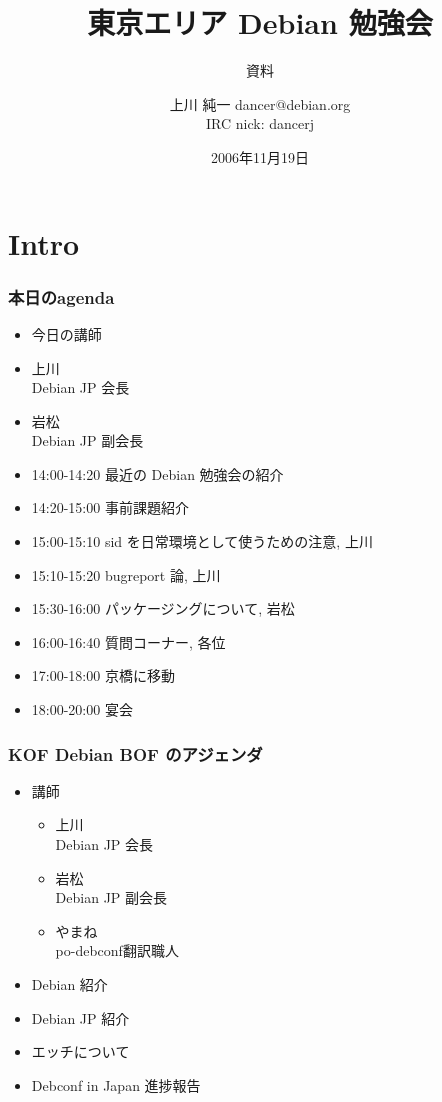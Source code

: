 \documentclass[cjk,dvipdfmx]{beamer}
\title{東京エリア Debian 勉強会}
\subtitle{資料}
\author{上川 純一 dancer@debian.org\\IRC nick: dancerj}
\date{2006年11月19日}
\begin{document}
\frame{\titlepage{}}

\section{Intro}

\begin{frame}
 \frametitle{本日のagenda}
\begin{minipage}[t]{0.35\hsize}
  \begin{itemize}
   \item 今日の講師
   \item 上川\\
	 Debian JP 会長
   \item 岩松\\
	 Debian JP 副会長
 \end{itemize}
\end{minipage} 
\begin{minipage}[t]{0.6\hsize}
 \begin{itemize}
  \item 14:00-14:20 最近の Debian 勉強会の紹介
  \item 14:20-15:00 事前課題紹介
  \item 15:00-15:10 sid を日常環境として使うための注意, 上川
  \item 15:10-15:20 bugreport 論, 上川
  \item 15:30-16:00 パッケージングについて, 岩松
  \item 16:00-16:40 質問コーナー, 各位
  \item 17:00-18:00 京橋に移動
  \item 18:00-20:00 宴会
 \end{itemize}
\end{minipage}
\end{frame}

\begin{frame}
 \frametitle{KOF Debian BOF のアジェンダ}
\begin{minipage}[t]{0.4\hsize}
  \begin{itemize}
  \item 講師
	\begin{itemize} 
	 \item 上川\\
	       Debian JP 会長
	 \item 岩松\\
	       Debian JP 副会長
	 \item やまね\\
	       po-debconf翻訳職人
	\end{itemize}
 \end{itemize}
\end{minipage} 
\begin{minipage}[t]{0.4\hsize}
 \begin{itemize}
  \item Debian 紹介
  \item Debian JP 紹介
  \item エッチについて
  \item Debconf in Japan 進捗報告
 \end{itemize}
\end{minipage}
\end{frame}
\end{document}
